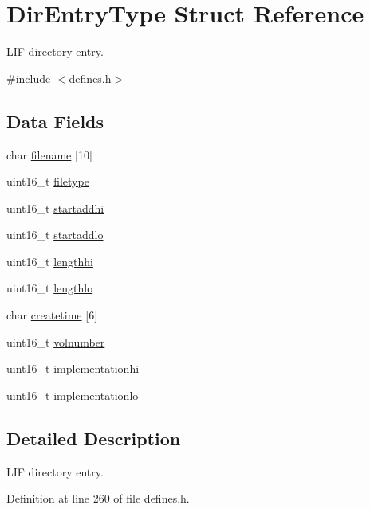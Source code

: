 \hypertarget{structDirEntryType}{}\section{Dir\+Entry\+Type Struct Reference}
\label{structDirEntryType}


L\+IF directory entry.  




{\ttfamily \#include $<$defines.\+h$>$}

\subsection*{Data Fields}
\begin{DoxyCompactItemize}
\item 
char \hyperlink{structDirEntryType_aa60fae0a6b7ba9c966cbcf46e555f396}{filename} \mbox{[}10\mbox{]}
\item 
uint16\+\_\+t \hyperlink{structDirEntryType_ada14562440087858ebf04bc4c81eedd2}{filetype}
\item 
uint16\+\_\+t \hyperlink{structDirEntryType_a0cab2915e9f864e25b24d298c36c11db}{startaddhi}
\item 
uint16\+\_\+t \hyperlink{structDirEntryType_aea0e798bb172b4bddf174ce339a4a54a}{startaddlo}
\item 
uint16\+\_\+t \hyperlink{structDirEntryType_ad7aaba7b01038bc8bacb096bd66fff08}{lengthhi}
\item 
uint16\+\_\+t \hyperlink{structDirEntryType_ad1cde25a0229866557cd5983c27fbd31}{lengthlo}
\item 
char \hyperlink{structDirEntryType_a627fd55537c73d4fee596b140e106c01}{createtime} \mbox{[}6\mbox{]}
\item 
uint16\+\_\+t \hyperlink{structDirEntryType_add9ab11f89586efb100471f6580e75c5}{volnumber}
\item 
uint16\+\_\+t \hyperlink{structDirEntryType_a27a15eea3264d44c9e93e3be77093151}{implementationhi}
\item 
uint16\+\_\+t \hyperlink{structDirEntryType_a8164d577c06fb7c312aaa4955d491449}{implementationlo}
\end{DoxyCompactItemize}


\subsection{Detailed Description}
L\+IF directory entry. 

Definition at line 260 of file defines.\+h.



